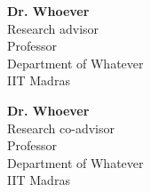 \vspace{-\parskip}
\begingroup
\singlespacing
\begin{flushright}
\textbf{Dr. Whoever}    \\
Research advisor        \\
Professor               \\
Department of Whatever  \\
IIT Madras              \\

\par
\vspace{3\parskip}

\textbf{Dr. Whoever}    \\
Research co-advisor     \\
Professor               \\
Department of Whatever  \\
IIT Madras              \\
\end{flushright}
\endgroup
\par
